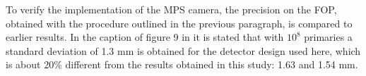 \documentclass[a4paper,english]{article}
\begin{document}
To verify the implementation of the MPS camera, the precision on the FOP, obtained with the procedure outlined in the previous paragraph, is compared to earlier results. In the caption of figure 9 in \cite{Pinto2014a} it is stated that with $10^8$ primaries a standard deviation of 1.3 mm is obtained for the detector design used here, which is about 20\% different from the results obtained in this study: 1.63 and 1.54 mm.
\newpage




\end{document}
